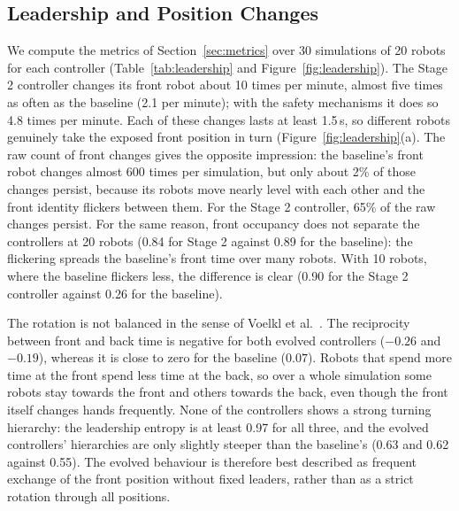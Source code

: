 \documentclass[runningheads]{llncs}
\begin{document}
\subsection{Leadership and Position Changes}
\label{sec:leadership_results}




We compute the metrics of Section~\ref{sec:metrics} over 30 simulations of 20 robots for each controller (Table~\ref{tab:leadership} and Figure~\ref{fig:leadership}). The Stage 2 controller changes its front robot about 10 times per minute, almost five times as often as the baseline
(2.1 per minute); with the safety mechanisms it does so 4.8 times per minute. Each of these changes lasts at least 1.5\,s, so different robots genuinely take the exposed front position in turn (Figure~\ref{fig:leadership}(a). The raw count of front changes gives the opposite impression: the baseline's front robot changes almost 600 times per simulation, but only about 2\% of those changes persist, because its robots move nearly level with each other and the front identity flickers between them. For the Stage 2 controller, 65\% of the raw changes persist. For the same reason, front occupancy does not separate the controllers at 20 robots (0.84 for Stage 2 against 0.89 for the baseline): the flickering spreads the baseline's front time over many robots. With 10 robots, where the baseline flickers less, the difference is clear (0.90 for the Stage 2 controller against 0.26 for the baseline).

The rotation is not balanced in the sense of Voelkl et al.~\cite{voelkl2015}. The reciprocity between front and back time is negative for both evolved controllers ($-0.26$ and $-0.19$), whereas it is close to zero for the baseline ($0.07$). Robots that spend more time at the front spend less time at the back, so over a whole simulation some robots stay towards the front and others towards the back, even though the front itself changes hands frequently. None of the controllers shows a strong turning hierarchy: the leadership entropy is at least 0.97 for all three, and the evolved controllers' hierarchies are only slightly
steeper than the baseline's (0.63 and 0.62 against 0.55). The evolved behaviour is therefore best described as frequent exchange of the front position without fixed leaders, rather than as a strict rotation through all positions.
\end{document}
